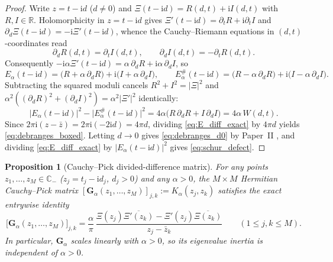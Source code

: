 \documentclass[11pt,reqno]{amsart}
\newtheorem{proposition}[theorem]{Proposition}
\theoremstyle{definition}
\theoremstyle{remark}
\numberwithin{equation}{section}
\newcommand{\ii}{\mathrm{i}}
\begin{document}
\begin{proof}
Write $z = t - \ii d$ ($d \neq 0$) and $\Xi(t - \ii d) = R(d,t) + \ii I(d,t)$ with $R,I \in \mathbb{R}$. Holomorphicity in $z = t - \ii d$ gives $\Xi'(t-\ii d) = \partial_t R + \ii\partial_t I$ and $\partial_d\Xi(t-\ii d) = -\ii\Xi'(t-\ii d)$, whence the Cauchy--Riemann equations in $(d,t)$-coordinates read
\begin{equation}\label{eq:CR_dt}
  \partial_d R(d,t) = \partial_t I(d,t), \qquad
  \partial_d I(d,t) = -\partial_t R(d,t).
\end{equation}
Consequently $-\ii\alpha\Xi'(t-\ii d) = \alpha\,\partial_d R + \ii\alpha\,\partial_d I$, so
\begin{equation}\label{eq:E_real_imag}
  E_\alpha(t - \ii d) = \bigl(R + \alpha\,\partial_d R\bigr) + \ii\bigl(I + \alpha\,\partial_d I\bigr), \qquad
  E_\alpha^\#(t - \ii d) = \bigl(R - \alpha\,\partial_d R\bigr) + \ii\bigl(I - \alpha\,\partial_d I\bigr).
\end{equation}
Subtracting the squared moduli cancels $R^2 + I^2 = \lvert\Xi\rvert^2$ and $\alpha^2((\partial_d R)^2 + (\partial_d I)^2) = \alpha^2\lvert\Xi'\rvert^2$ identically:
\begin{equation}\label{eq:E_diff_exact}
  \lvert E_\alpha(t - \ii d)\rvert^2 - \lvert E_\alpha^\#(t - \ii d)\rvert^2
  = 4\alpha\bigl(R\,\partial_d R + I\,\partial_d I\bigr) = 4\alpha\,W(d,t).
\end{equation}
Since $2\pi\ii(z - \bar{z}) = 2\pi\ii(-2\ii d) = 4\pi d$, dividing \eqref{eq:E_diff_exact} by $4\pi d$ yields \eqref{eq:debranges_boxed}. Letting $d \to 0$ gives \eqref{eq:debranges_d0} by Paper~II \cite{Missiaen2026Paper2}, and dividing \eqref{eq:E_diff_exact} by $\lvert E_\alpha(t-\ii d)\rvert^2$ gives \eqref{eq:schur_defect}.
\end{proof}

\begin{proposition}[Cauchy--Pick divided-difference matrix]\label{prop:cauchy_pick_gram}
For any points $z_1,\dots,z_M \in \mathbb{C}_-$ ($z_j = t_j - \ii d_j$, $d_j > 0$) and any $\alpha > 0$, the $M \times M$ Hermitian Cauchy--Pick matrix $[\mathbf{G}_\alpha(z_1,\dots,z_M)]_{j,k} := K_\alpha(z_j, z_k)$ satisfies the exact entrywise identity
\begin{equation}\label{eq:gram_divided_diff}
  \bigl[\mathbf{G}_\alpha(z_1,\dots,z_M)\bigr]_{j,k}
  = \frac{\alpha}{\pi}\,\frac{\Xi(z_j)\overline{\Xi'(z_k)} - \Xi'(z_j)\overline{\Xi(z_k)}}{z_j - \bar{z}_k}
  \qquad (1 \le j,k \le M).
\end{equation}
In particular, $\mathbf{G}_\alpha$ scales linearly with $\alpha > 0$, so its eigenvalue inertia is independent of $\alpha > 0$.
\end{proposition}
\end{document}
